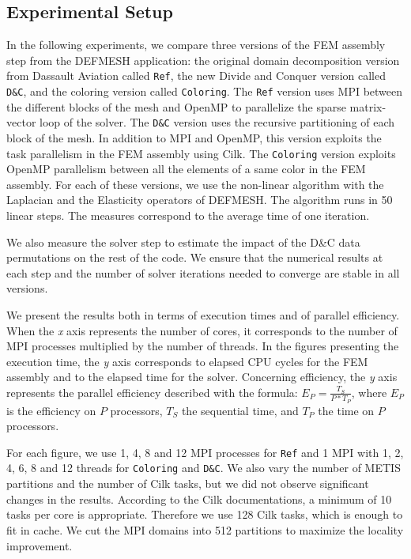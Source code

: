 \documentclass[10pt]{IOS-Book-Article}
\begin{document}
\subsection{Experimental Setup}
In the following experiments, we compare three versions of the FEM assembly step from the DEFMESH application:
the original domain decomposition version from Dassault Aviation called {\tt Ref}, the new Divide and Conquer version called {\tt D\&C}, and the coloring version called {\tt Coloring}.
The {\tt Ref} version uses MPI between the different blocks of the mesh and OpenMP to parallelize the sparse matrix-vector loop of the solver.
The {\tt D\&C} version uses the recursive partitioning of each block of the mesh.
In addition to MPI and OpenMP, this version exploits the task parallelism in the FEM assembly using Cilk.
The {\tt Coloring} version exploits OpenMP parallelism between all the elements of a same color in the FEM assembly.
For each of these versions, we use the non-linear algorithm with the Laplacian and the Elasticity operators of DEFMESH.
The algorithm runs in 50 linear steps.
The measures correspond to the average time of one iteration.


We also measure the solver step to estimate the impact of the D\&C data permutations on the rest of the code.
We ensure that the numerical results at each step and the number of solver iterations needed to converge are stable in all versions.

We present the results both in terms of execution times and of parallel efficiency.
When the \emph{x} axis represents the number of cores, it corresponds to the number of MPI processes multiplied by the number of threads.
In the figures presenting the execution time, the \emph{y} axis corresponds to elapsed CPU cycles for the FEM assembly and to the elapsed time for the solver.
Concerning efficiency, the \emph{y} axis represents the parallel efficiency described with the formula:
$E_{P} = \frac{T_{S}}{P*T_{P}}$, where $E_{P}$ is the efficiency on $P$ processors, $T_{S}$ the sequential time, and $T_{P}$ the time on $P$ processors.

For each figure, we use 1, 4, 8 and 12 MPI processes for {\tt Ref} and 1 MPI with 1, 2, 4, 6, 8 and 12 threads for {\tt Coloring} and {\tt D\&C}.
We also vary the number of METIS partitions and the number of Cilk tasks, but we did not observe significant changes in the results.
According to the Cilk documentations, a minimum of 10 tasks per core is appropriate.
Therefore we use 128 Cilk tasks, which is enough to fit in cache.
We cut the MPI domains into 512 partitions to maximize the locality improvement.
\end{document}

